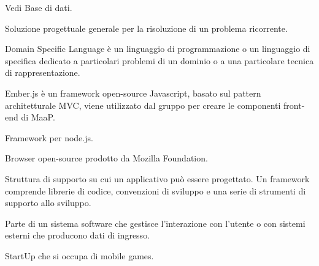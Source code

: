 
\begin{itemize}


Vedi Base di dati.





Soluzione progettuale generale per la risoluzione di un problema ricorrente.


Domain Specific Language è un linguaggio di programmazione o un linguaggio di specifica dedicato a particolari problemi di un dominio o a una particolare tecnica di rappresentazione.
\end{itemize}


\begin{itemize}


Ember.js è un framework open-source Javascript, basato sul pattern architetturale MVC, viene utilizzato dal gruppo per creare le componenti front-end di MaaP.


Framework per node.js.

\end{itemize}


\begin{itemize}


Browser open-source prodotto da Mozilla Foundation.


Struttura di supporto su cui un applicativo può essere progettato.
Un framework comprende librerie di codice, convenzioni di sviluppo e una serie di strumenti di supporto allo sviluppo.


Parte di un sistema software che gestisce l'interazione con l'utente o con sistemi esterni che producono dati di ingresso.


StartUp che si occupa di mobile games.


\end{itemize}

